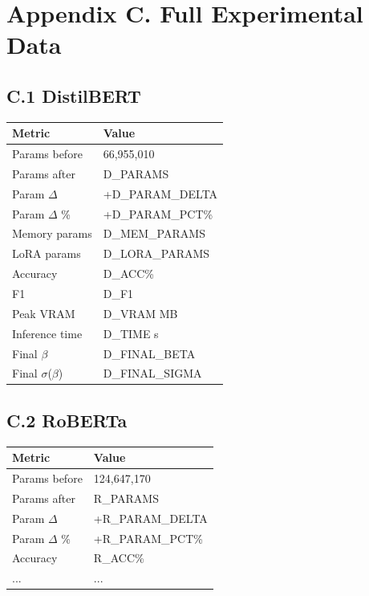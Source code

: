 
\section{Appendix C. Full Experimental Data}

\subsection{C.1 DistilBERT}

\begin{table}[H]
\centering
\small
\begin{tabular}{ll}
\toprule
\textbf{Metric} & \textbf{Value} \\
\midrule
Params before & 66,955,010 \\
Params after & {{D\_PARAMS}} \\
Param $\Delta$ & +{{D\_PARAM\_DELTA}} \\
Param $\Delta$ \% & +{{D\_PARAM\_PCT}}\% \\
Memory params & {{D\_MEM\_PARAMS}} \\
LoRA params & {{D\_LORA\_PARAMS}} \\
Accuracy & {{D\_ACC}}\% \\
F1 & {{D\_F1}} \\
Peak VRAM & {{D\_VRAM}} MB \\
Inference time & {{D\_TIME}} s \\
Final $\beta$ & {{D\_FINAL\_BETA}} \\
Final $\sigma$($\beta$) & {{D\_FINAL\_SIGMA}} \\
\bottomrule
\end{tabular}
\end{table}

\subsection{C.2 RoBERTa}

\begin{table}[H]
\centering
\small
\begin{tabular}{ll}
\toprule
\textbf{Metric} & \textbf{Value} \\
\midrule
Params before & 124,647,170 \\
Params after & {{R\_PARAMS}} \\
Param $\Delta$ & +{{R\_PARAM\_DELTA}} \\
Param $\Delta$ \% & +{{R\_PARAM\_PCT}}\% \\
Accuracy & {{R\_ACC}}\% \\
... & ... \\
\bottomrule
\end{tabular}
\end{table}

